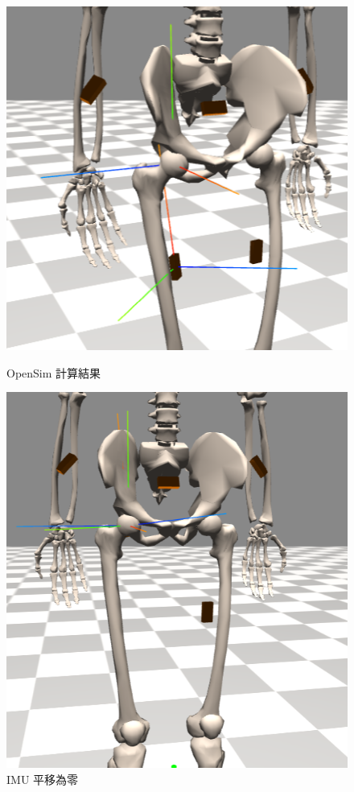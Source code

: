 \begin{figure}[!ht]
   \centering
   \begin{minipage}{.3\textwidth}
     \centering
     \includegraphics[width=.8\linewidth, height=.8\linewidth]{figure/ch3_fig_imu_ori.png}
     \caption[OpenSim 計算結果]{OpenSim 計算結果}
     \label{ch3_fig_imu_ori}
   \end{minipage}%
   \begin{minipage}{.3\textwidth}
     \centering
     \includegraphics[width=.8\linewidth, height=.8\linewidth]{figure/ch3_fig_imu_tra.png}
     \caption[IMU 平移為零]{IMU 平移為零}
     \label{ch3_fig_imu_tra}

\end{minipage}
\end{figure}
